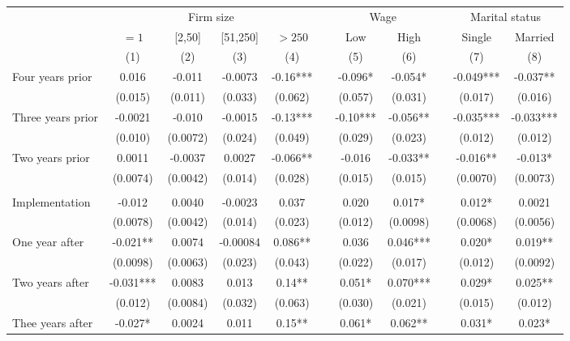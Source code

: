 \begin{tabular}{lcccccccccc}
\toprule
      & \multicolumn{4}{c}{Firm size} &       & \multicolumn{2}{c}{Wage} &       & \multicolumn{2}{c}{Marital status} \\
\cmidrule{2-5}\cmidrule{7-8}\cmidrule{10-11}      & $= 1 $ & [2,50] & [51,250] & $> 250$ &       & Low   & High  &       & Single & Married \\
\midrule
      & (1)   & (2)   & (3)   & (4)   &       & (5)   & (6)   &       & (7)   & (8) \\
\midrule
\midrule
Four years prior & 0.016 & -0.011 & -0.0073 & -0.16*** &       & -0.096* & -0.054* &       & -0.049*** & -0.037** \\
      & (0.015) & (0.011) & (0.033) & (0.062) &       & (0.057) & (0.031) &       & (0.017) & (0.016) \\
Three years prior & -0.0021 & -0.010 & -0.0015 & -0.13*** &       & -0.10*** & -0.056** &       & -0.035*** & -0.033*** \\
      & (0.010) & (0.0072) & (0.024) & (0.049) &       & (0.029) & (0.023) &       & (0.012) & (0.012) \\
Two years prior & 0.0011 & -0.0037 & 0.0027 & -0.066** &       & -0.016 & -0.033** &       & -0.016** & -0.013* \\
      & (0.0074) & (0.0042) & (0.014) & (0.028) &       & (0.015) & (0.015) &       & (0.0070) & (0.0073) \\
      &       &       &       &       &       &       &       &       &       &  \\
Implementation & -0.012 & 0.0040 & -0.0023 & 0.037 &       & 0.020 & 0.017* &       & 0.012* & 0.0021 \\
      & (0.0078) & (0.0042) & (0.014) & (0.023) &       & (0.012) & (0.0098) &       & (0.0068) & (0.0056) \\
One year after & -0.021** & 0.0074 & -0.00084 & 0.086** &       & 0.036 & 0.046*** &       & 0.020* & 0.019** \\
      & (0.0098) & (0.0063) & (0.023) & (0.043) &       & (0.022) & (0.017) &       & (0.012) & (0.0092) \\
Two years after & -0.031*** & 0.0083 & 0.013 & 0.14** &       & 0.051* & 0.070*** &       & 0.029* & 0.025** \\
      & (0.012) & (0.0084) & (0.032) & (0.063) &       & (0.030) & (0.021) &       & (0.015) & (0.012) \\
Thee years after & -0.027* & 0.0024 & 0.011 & 0.15** &       & 0.061* & 0.062** &       & 0.031* & 0.023* \\

\end{tabular}
